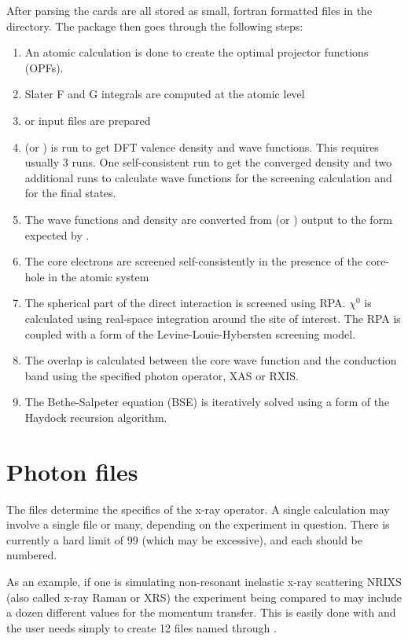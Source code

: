\documentclass[11pt]{report}
\begin{document}
After parsing the cards are all stored as small, fortran formatted files in the  directory. The package then goes through the following steps:
\begin{enumerate}
\item An atomic calculation is done to create the optimal projector functions (OPFs).
\item Slater F and G integrals are computed at the atomic level
\item {} or  input files are prepared
\item {} (or ) is run to get DFT valence density and wave functions. This requires usually 3 runs. One self-consistent run to get the converged density and two additional runs to calculate wave functions for the screening calculation and for the final states.
\item The wave functions and density are converted from  (or )  output to the form expected by .
\item The core electrons are screened self-consistently in the presence of the core-hole in the atomic system
\item The spherical part of the direct interaction is screened using RPA. $\chi^0$ is calculated using real-space integration around the site of interest. The RPA is coupled with a form of the Levine-Louie-Hybersten screening model.
\item The overlap is calculated between the core wave function and the conduction band using the specified photon operator, XAS or RXIS.
\item The Bethe-Salpeter equation (BSE) is iteratively solved using a form of the Haydock recursion algorithm.
\end{enumerate}

\section{Photon files}
\label{photon_files}
The  files determine the specifics of the x-ray operator. A single  
calculation may involve a single  file or many, depending on the experiment in question. 
There is currently a hard limit of 99 (which may be excessive), and each should be numbered. 

As an example, if one is simulating non-resonant inelastic x-ray scattering NRIXS (also called x-ray Raman or XRS) 
the experiment being compared to may include a dozen different values for the momentum transfer. 
This is easily done with  and the user needs simply to create 12 files 
named  through .  
\end{document}
